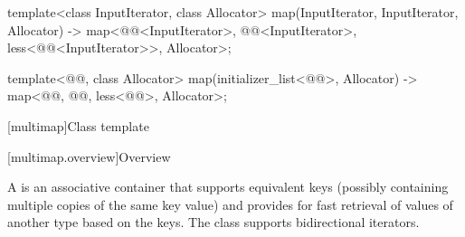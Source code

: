 \documentclass{wg21}
\begin{document}
\begin{codeblock}
{    template<class InputIterator, class Allocator>
    map(InputIterator, InputIterator, Allocator)
    -> map<@@<InputIterator>, @@<InputIterator>,
    less<@@<InputIterator>>, Allocator>;

    template<@@, class Allocator>
    map(initializer_list<@@>, Allocator)
    -> map<@@, @@, less<@@>, Allocator>;
}
\end{codeblock}


[multimap]{Class template }

[multimap.overview]{Overview}

\pnum
{}%
A
is an associative container that supports equivalent keys (possibly containing multiple copies of
the same key value) and provides for fast retrieval of values of another type
based on the keys.
The
class
supports bidirectional iterators.
\end{document}
